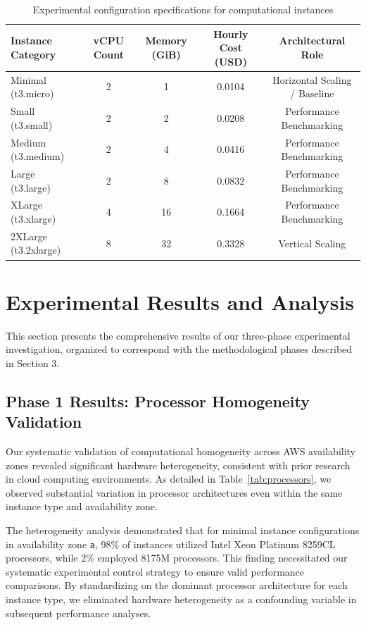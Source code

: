 \documentclass[conference]{IEEEtran}
\begin{document}
	\begin{table}[t]
		\centering
		\caption{Experimental configuration specifications for computational instances}
		\label{tab:experimental_configurations}
		\begin{tabular}{|l|c|c|c|c|}
			\hline
			\textbf{Instance Category} & \textbf{vCPU Count} & \textbf{Memory (GiB)} & \textbf{Hourly Cost (USD)} & \textbf{Architectural Role} \\
			\hline
			Minimal (t3.micro) & 2 & 1 & 0.0104 & Horizontal Scaling / Baseline \\
			\hline
			Small (t3.small) & 2 & 2 & 0.0208 & Performance Benchmarking \\
			\hline
			Medium (t3.medium) & 2 & 4 & 0.0416 & Performance Benchmarking \\
			\hline
			Large (t3.large) & 2 & 8 & 0.0832 & Performance Benchmarking \\
			\hline
			XLarge (t3.xlarge) & 4 & 16 & 0.1664 & Performance Benchmarking \\
			\hline
			2XLarge (t3.2xlarge) & 8 & 32 & 0.3328 & Vertical Scaling \\
			\hline
		\end{tabular}
	\end{table}
	
	\section{Experimental Results and Analysis}
	\label{experiments}
	
	This section presents the comprehensive results of our three-phase experimental investigation, organized to correspond with the methodological phases described in Section 3.
	
	\subsection{Phase 1 Results: Processor Homogeneity Validation}
	\label{results-phase1}
	
	Our systematic validation of computational homogeneity across AWS availability zones revealed significant hardware heterogeneity, consistent with prior research in cloud computing environments. As detailed in Table~\ref{tab:processors}, we observed substantial variation in processor architectures even within the same instance type and availability zone.
	
	The heterogeneity analysis demonstrated that for minimal instance configurations in availability zone \texttt{a}, 98\% of instances utilized Intel Xeon Platinum 8259CL processors, while 2\% employed 8175M processors. This finding necessitated our systematic experimental control strategy to ensure valid performance comparisons. By standardizing on the dominant processor architecture for each instance type, we eliminated hardware heterogeneity as a confounding variable in subsequent performance analyses.
	
\end{document}
